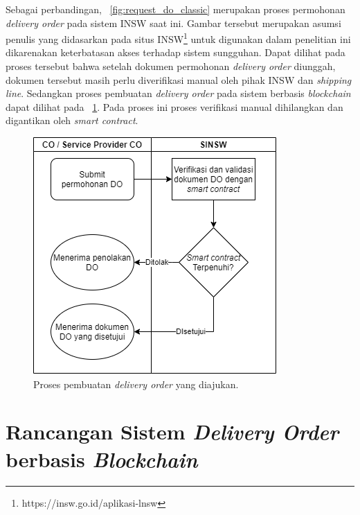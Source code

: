 Sebagai perbandingan, \pic~\ref{fig:request_do_classic} merupakan proses permohonan \textit{delivery order} pada sistem INSW saat ini. Gambar tersebut merupakan asumsi penulis yang didasarkan pada situs INSW\footnote{https://insw.go.id/aplikasi-lnsw} untuk digunakan dalam penelitian ini dikarenakan keterbatasan akses terhadap sistem sungguhan. Dapat dilihat pada proses tersebut bahwa setelah dokumen permohonan \textit{delivery order} diunggah, dokumen tersebut masih perlu diverifikasi manual oleh pihak INSW dan \textit{shipping line}. Sedangkan proses pembuatan \textit{delivery order} pada sistem berbasis \textit{blockchain} dapat dilihat pada \pic~\ref{fig:request_do_blockchain_flow}. Pada proses ini proses verifikasi manual dihilangkan dan digantikan oleh \textit{smart contract}.

\begin{figure}
	\centering
	\includegraphics[width=\textwidth]{assets/pics/request_do_blockchain_flow.png}
	\caption{Proses pembuatan \textit{delivery order} yang diajukan.}
	\label{fig:request_do_blockchain_flow}
\end{figure}


\section{Rancangan Sistem \textit{Delivery Order} berbasis \textit{Blockchain}}
\label{sec:rancangansistem}

